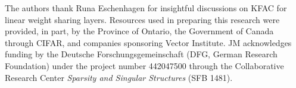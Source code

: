 \begin{ack} %
  The authors thank Runa Eschenhagen for insightful discussions on KFAC for linear weight sharing layers.
  Resources used in preparing this research were provided, in part, by the Province of Ontario, the Government of Canada through CIFAR, and companies sponsoring Vector Institute.
  JM acknowledges funding by the Deutsche Forschungsgemeinschaft (DFG, German Research Foundation) under the project number 442047500 through the Collaborative Research Center \emph{Sparsity and Singular Structures} (SFB 1481).
\end{ack}
